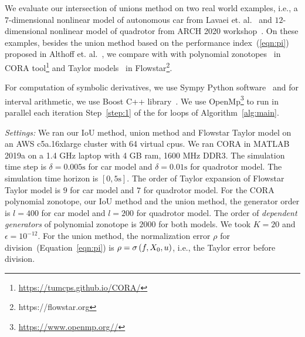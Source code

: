 We evaluate our intersection of unions method on two real world
examples, i.e., a $7$-dimensional nonlinear model of autonomous car
from Lavaei et. al.~\cite{lavaei2020formal} and $12$-dimensional
nonlinear model of quadrotor from ARCH 2020
workshop~\cite{geretti2020arch}.  On these examples, besides the union
method based on the performance index~(\ref{eqn:pi}) proposed in
Althoff et. al.~\cite{althoff2008reachability}, we compare with
with polynomial zonotopes~\cite{althoff2013reachability} in CORA
tool\footnote{\url{https://tumcps.github.io/CORA/}} and Taylor
models~\cite{chen2012taylor} in
Flowstar\footnote{https://flowstar.org}.

For computation of symbolic derivatives, we use Sympy Python
software~\cite{10.7717/peerj-cs.103} and for interval arithmetic, we
use Boost C++ library~\cite{bronnimann2006design}.  We use
OpenMp\footnote{\url{https://www.openmp.org//}} to run in
parallel each iteration Step~\ref{step:1} of the for loops of
Algorithm~\ref{alg:main}.

\emph{Settings:}  We
ran our IoU method, union method and Flowstar Taylor model on an AWS
c5a.16xlarge cluster with 64 virtual cpus.  We ran CORA in MATLAB
2019a on a 1.4 GHz laptop with 4 GB ram, 1600 MHz DDR3.  The
simulation time step is $\delta = 0.005\si{\second}$ for car model and
$\delta = 0.01\si{\second}$ for quadrotor model.  The simulation time
horizon is $[0, 5\si{\second}]$.  The order of Taylor expansion of
Flowstar Taylor model is $9$ for car model and $7$ for quadrotor
model.  For the CORA polynomial zonotope, our IoU method and the union
method, the generator order is $l=400$ for car model and $l=200$ for
quadrotor model.  The order of \emph{dependent generators} of
polynomial zonotope is $2000$ for both models.  We took $K = 20$ and
$\epsilon = 10^{-12}$.  For the union method, the normalization error
$\rho$ for division~(Equation~\ref{eqn:pi}) is $\rho
= \sigma\left(f,X_0,u\right)$, i.e., the Taylor error before division.


